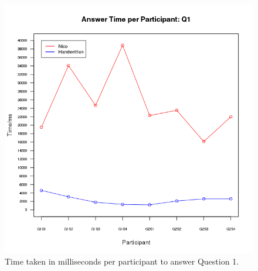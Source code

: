 \documentclass[12pt,twoside,notitlepage,xetex]{report}
\begin{document}
{\begin{center}
\begin{figure}[H]
\begin{center}
\includegraphics[height=\textheight/2-2cm]{figs/graphs/q1.png}
\end{center}
\caption{Time taken in milliseconds per participant to answer Question 1.}
\end{figure}
\end{center}

}
\end{document}
